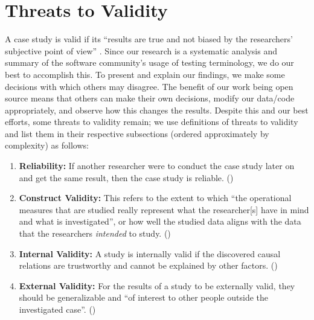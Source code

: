 \section{Threats to Validity}\label{threats}

A case study is valid if its ``results are true and not biased by the
researchers' subjective point of view'' \citep[p.~153]{RunesonAndHöst2009}.
Since our research is a systematic analysis and summary of the software
community's usage of testing terminology, we do our
best to accomplish this. To present and explain our findings,
we make some decisions with which others may disagree. The benefit of our work
being open source means that others can make their own decisions, modify our
data/code appropriately, and observe how this changes the results. Despite this
and our best efforts, some threats to validity remain; we use
 definitions of threats to validity
and list them in their respective subsections (ordered approximately by
complexity) as follows:
\begin{enumerate}
    \item \textbf{Reliability:} If another researcher were to conduct the case
          study later on and get the same result, then the case study is
          reliable. ()
    \item \textbf{Construct Validity:} This refers to the extent to which ``the
          operational measures that are studied really represent what the
          researcher[s] have in mind and what is investigated'', or how well
          the studied data aligns with the data that the researchers
          \emph{intended} to study. ()
    \item \textbf{Internal Validity:} A study is internally valid if the
          discovered causal relations are trustworthy and cannot be explained
          by other factors. %
          ()
    \item \textbf{External Validity:} For the results of a study to be externally
          valid, they should be generalizable and ``of interest to other people
          outside the investigated case''. ()
\end{enumerate}

